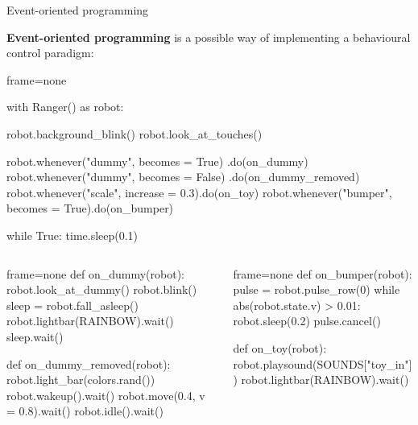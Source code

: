 \documentclass[compress]{beamer}
\begin{document}
\begin{frame}[fragile]{Event-oriented programming}

    {\bf Event-oriented programming} is a possible way of implementing a
    behavioural control paradigm:
    \vspace{1em}

\begin{overprint}
\begin{pythoncode*}{frame=none}

with Ranger() as robot:

    robot.background_blink()
    robot.look_at_touches()

    robot.whenever("dummy", becomes = True)
                                .do(on_dummy)
    robot.whenever("dummy", becomes = False)
                                .do(on_dummy_removed)
    robot.whenever("scale", increase = 0.3).do(on_toy)
    robot.whenever("bumper", becomes = True).do(on_bumper)

    while True:
        time.sleep(0.1)
\end{pythoncode*}

    
    
    \begin{columns}
        \begin{column}{0.45\linewidth}
            \begin{pythoncode*}{frame=none}
def on_dummy(robot):
    robot.look_at_dummy()
    robot.blink()
    sleep = robot.fall_asleep()
    robot.lightbar(RAINBOW).wait()
    sleep.wait()

def on_dummy_removed(robot):
    robot.light_bar(colors.rand())
    robot.wakeup().wait()
    robot.move(0.4, v = 0.8).wait()
    robot.idle().wait()

\end{pythoncode*}
\end{column}
        \begin{column}{0.55\linewidth}
\begin{pythoncode*}{frame=none}
def on_bumper(robot):
    pulse = robot.pulse_row(0)
    while abs(robot.state.v) > 0.01:
        robot.sleep(0.2)
    pulse.cancel()

def on_toy(robot):
    robot.playsound(SOUNDS["toy_in"])
    robot.lightbar(RAINBOW).wait()
\end{pythoncode*}
        \end{column}
    \end{columns}
\end{overprint}
\end{frame}
\end{document}
